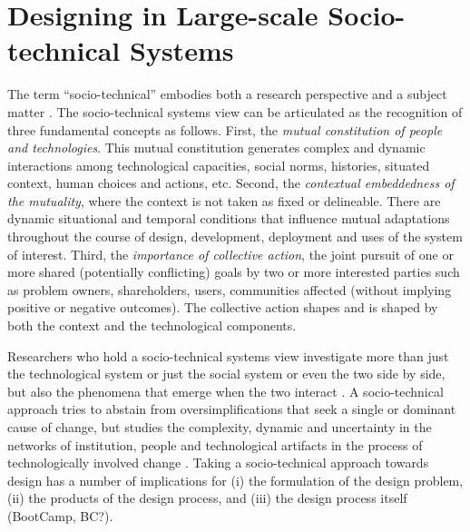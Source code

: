 \section{Designing in Large-scale Socio-technical Systems}
\label{sec:design}

The term ``socio-technical'' embodies both a research perspective and a subject matter \cite{Lee2001}.
The socio-technical systems view can be articulated as the recognition of three fundamental concepts \cite{Sawyer2014} as follows. 
%
First, the \textit{mutual constitution of people and technologies}. This mutual constitution generates complex and dynamic interactions among technological capacities, social norms, histories, situated context, human choices and actions, etc. 
%
Second, the \textit{contextual embeddedness of the mutuality}, where the context is not taken as fixed or delineable. There are dynamic situational and temporal conditions that influence 
mutual adaptations throughout the course of design, development, deployment and uses of the system of interest. 
% 
Third, the \textit{importance of collective action}, the joint pursuit of one or more shared (potentially conflicting) goals by two or more interested parties such as problem owners, shareholders, users, communities affected (without implying positive or negative outcomes). The collective action shapes and is shaped by both the context and the technological components. 

Researchers who hold a socio-technical systems view investigate more than just the technological system or just the social system or even the two side by side, but also the phenomena that emerge when the two interact \cite{Lee2001}. A socio-technical approach tries to abstain from oversimplifications that seek a single or dominant cause of change, but studies the complexity, dynamic and uncertainty in the networks of institution, people and technological artifacts in the process of technologically involved change \cite{Sawyer2014}. 
%
Taking a socio-technical approach towards design has a number of implications for (i) the formulation of the design problem, (ii) the products of the design process, and (iii) the design process itself (BootCamp, BC?).

